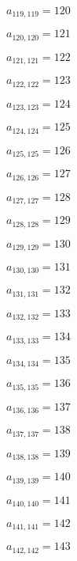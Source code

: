 \documentclass[a4paper,12pt]{article}
\begin{document}
$a _{ 119, 119 } = 120$

$a _{ 120, 120 } = 121$

$a _{ 121, 121 } = 122$

$a _{ 122, 122 } = 123$

$a _{ 123, 123 } = 124$

$a _{ 124, 124 } = 125$

$a _{ 125, 125 } = 126$

$a _{ 126, 126 } = 127$

$a _{ 127, 127 } = 128$

$a _{ 128, 128 } = 129$

$a _{ 129, 129 } = 130$

$a _{ 130, 130 } = 131$

$a _{ 131, 131 } = 132$

$a _{ 132, 132 } = 133$

$a _{ 133, 133 } = 134$

$a _{ 134, 134 } = 135$

$a _{ 135, 135 } = 136$

$a _{ 136, 136 } = 137$

$a _{ 137, 137 } = 138$

$a _{ 138, 138 } = 139$

$a _{ 139, 139 } = 140$

$a _{ 140, 140 } = 141$

$a _{ 141, 141 } = 142$

$a _{ 142, 142 } = 143$
\end{document}
